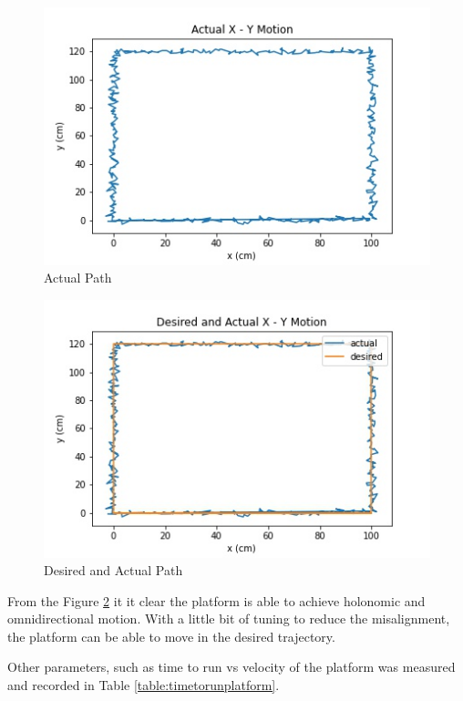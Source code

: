 \begin{figure}[H]
    \centering
    \includegraphics[scale = 0.8]{Figures/actualmotion.jpeg}
    \caption{Actual Path}
    \label{fig:actualpath}
\end{figure}

\begin{figure}[H]
    \centering
    \includegraphics[scale = 0.8]{Figures/desiredandactualmotion.jpeg}
    \caption{Desired and Actual Path}
    \label{fig:desiredandactualmotion}
\end{figure}

From the Figure \ref{fig:desiredandactualmotion} it it clear the platform is able to achieve holonomic and omnidirectional motion. With a little bit of tuning to reduce the misalignment, the platform can be able to move in the desired trajectory.

\par
Other parameters, such as time to run vs velocity of the platform was measured and recorded in Table \ref{table:timetorunplatform}.

